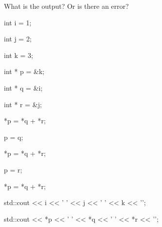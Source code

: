 What is the output? Or is there an error?



\begin{consolethree}[escapeinside=||]

int i = 1;

int j = 2;

int k = 3;

int * p = &k;

int * q = &i;

int * r = &j;

*p = *q + *r;

p = q;

*p = *q + *r;

p = r;

*p = *q + *r;

std::cout << i << ' ' << j << ' ' << k << '\n';

std::cout << *p << ' ' << *q << ' ' << *r << '\n'; 

\end{consolethree}


